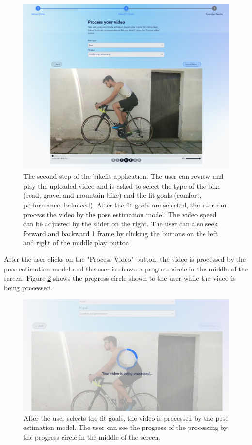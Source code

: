 \begin{figure}[htbp]
    \centering
    \includegraphics[width=\textwidth]{obrazky-figures/step2-crop.png}
    \caption{The second step of the bikefit application. The user can review and play the uploaded video and is asked to select the type of the bike (road, gravel and mountain bike) and the fit goals (comfort, performance, balanced). After the fit goals are selected, the user can process the video by the pose estimation model. The video speed can be adjusted by the slider on the right. The user can also seek forward and backward 1 frame by clicking the buttons on the left and right of the middle play button.}
    \label{fig:step2}
\end{figure}

After the user clicks on the "Process Video" button, the video is processed by the pose estimation model and the user is shown a progress circle in the middle of the screen. Figure \ref{fig:processing} shows the progress circle shown to the user while the video is being processed.

\begin{figure}[htbp]
    \centering
    \includegraphics[width=\textwidth]{obrazky-figures/processing-crop.jpeg}
    \caption{After the user selects the fit goals, the video is processed by the pose estimation model. The user can see the progress of the processing by the progress circle in the middle of the screen.}
    \label{fig:processing}
\end{figure}


